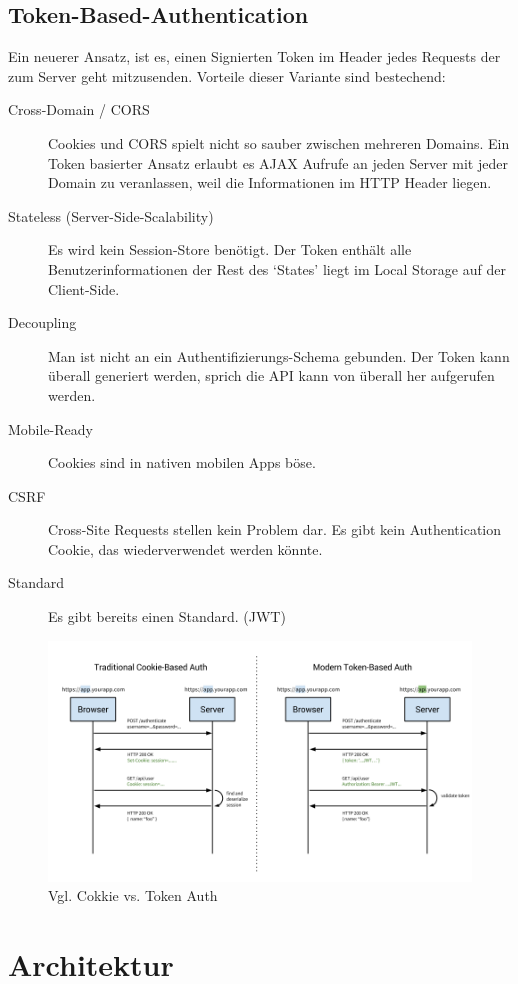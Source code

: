 \subsection{Token-Based-Authentication}
Ein neuerer Ansatz, ist es, einen Signierten Token im Header jedes Requests der zum Server geht mitzusenden. Vorteile dieser Variante sind bestechend:
\begin{description}
  \item[Cross-Domain / CORS]
  Cookies und CORS spielt nicht so sauber zwischen mehreren Domains. Ein Token basierter Ansatz erlaubt es AJAX Aufrufe an jeden Server mit jeder Domain zu veranlassen, weil die Informationen im HTTP Header liegen.
  \item[Stateless (Server-Side-Scalability)]Es wird kein Session-Store benötigt. Der Token enthält alle Benutzerinformationen der Rest des `States' liegt im Local Storage auf der Client-Side.
  \item[Decoupling] Man ist nicht an ein Authentifizierungs-Schema gebunden. Der Token kann überall generiert werden, sprich die API kann von überall her aufgerufen werden.
  \item[Mobile-Ready]Cookies sind in nativen mobilen Apps böse.
  \item[CSRF]Cross-Site Requests stellen kein Problem dar. Es gibt kein Authentication Cookie, das wiederverwendet werden könnte.
  \item[Standard]Es gibt bereits einen Standard. (\gls{JWT})
\end{description}
\begin{figure}[H]
    \centering
    \includegraphics[width=\linewidth]{fig/cookie-token-auth}
    \caption{Vgl. Cokkie vs. Token Auth}
    \label{fig:pd:cookie-token-auth}
\end{figure}
\section{Architektur}

